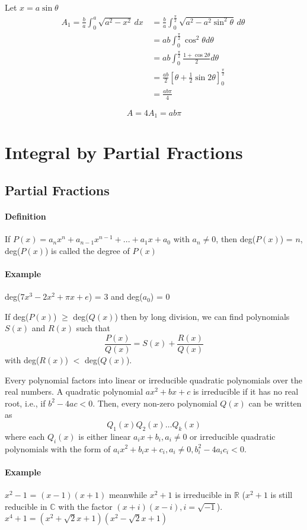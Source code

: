 \documentclass[12pt]{article}
\begin{document}
Let $x = a\sin \theta$
\begin{align*} 
    A_1 = \frac{b}{a} \int_0^a \sqrt{a^2 - x^2} \, dx\, 
    &= \frac{b}{a} \int_0^{\frac{\pi}{2}} \sqrt{a^2 - a^2 \sin^2 \theta}\, d\theta\ \\
    &= ab \int_0^{\frac{\pi}{2}} \cos^2 \theta d\theta \\
    &= ab \int_0^{\frac{\pi}{2}} \frac{1 + \cos 2\theta}{2} d\theta \\
    &= \frac{ab}{2} \left[ \theta + \frac{1}{2} \sin 2 \theta \right]_0^{\frac{\pi}{2}} \\
    &= \frac{ab\pi}{4}
\end{align*}
    
\[
    A = 4A_1 = ab\pi 
\]
\section{Integral by Partial Fractions}
\subsection{Partial Fractions}
\paragraph{Definition} If $P(x) = a_nx^n + a_{n-1}x^{n-1} + ... + a_1x + a_0$ with $a_n \neq 0$,
then deg($P(x)$) = $n$, deg($P(x)$) is called the degree of $P(x)$

\paragraph{Example} deg($7x^3 - 2x^2 + \pi x + e$) = 3 and deg($a_0$) = 0

If deg($P(x)$) $\geq$ deg($Q(x)$) then by long division, we can find polynomials $S(x)$ and $R(x)$ such that
\[
    \frac{P(x)}{Q(x)} = S(x) + \frac{R(x)}{Q(x)} 
\]
with deg($R(x)$) $<$ deg($Q(x)$).

Every polynomial factors into linear or irreducible quadratic polynomials over the real numbers. A quadratic polynomial $ax^2 + bx + c$ is irreducible 
if it has no real root, i.e., if $b^2 - 4ac < 0$. Then, every non-zero polynomial $Q(x)$ can be written as 
\[
    Q_1(x)Q_2(x)\dots Q_k(x)
\]
where each $Q_i(x)$ is either linear $a_i x + b_i, a_i \neq 0$ or irreducible quadratic polynomials with the form of $a_i x^2 + b_i x + c_i, a_i \neq 0, b_i^2 - 4a_ic_i < 0$.

\paragraph{Example} $x^2 - 1$ = $(x - 1)(x + 1)$ meanwhile $x^2 + 1$ is irreducible in $\mathbb{R}$ ($x^2 + 1$ is still reducible in $\mathbb{C}$ with the factor $(x + i)(x-i), i = \sqrt{-1}$).
$x^4 + 1 = (x^2 + \sqrt{2}x + 1)(x^2 - \sqrt{2}x + 1)$
\end{document}
